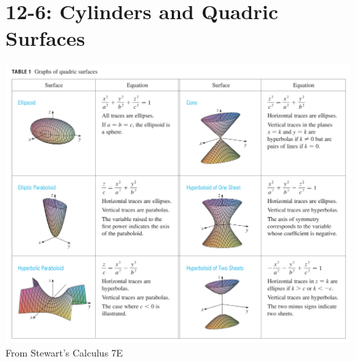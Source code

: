 \documentclass[12pt]{exam}
\begin{document}
\section*{12-6: Cylinders and Quadric Surfaces}

\begin{center}
\includegraphics[width=\textwidth]{quadratic_surfaces.pdf}
From Stewart's Calculus 7E
\end{center}
\end{document}
